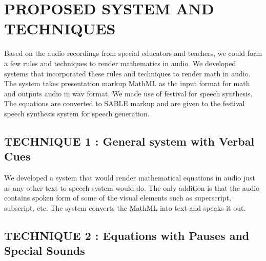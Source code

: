 \documentclass{article}
\begin{document}
\section{PROPOSED SYSTEM AND TECHNIQUES}
\label{sec:proposedsystem}

Based on the audio recordings from special educators and teachers, we could form a few rules and techniques to render mathematics in audio. We developed systems that incorporated these rules and techniques to render math in audio. The system takes presentation markup MathML as the input format for math and outputs audio in wav format. We made use of festival for speech synthesis. The equations are converted to SABLE markup and are given to the festival speech synthesis system for speech generation. 



\subsection{TECHNIQUE 1 : General system with Verbal Cues}
\label{ssec:t1}

We developed a system that would render mathematical equations in audio just as any other text to speech system would do. The only addition is that the audio contains spoken form of some of the visual elements such as superscript, subscript, etc. The system converts the MathML into text and speaks it out.


\subsection{TECHNIQUE 2 : Equations with Pauses and Special Sounds}
\label{ssec:t2}
\end{document}
